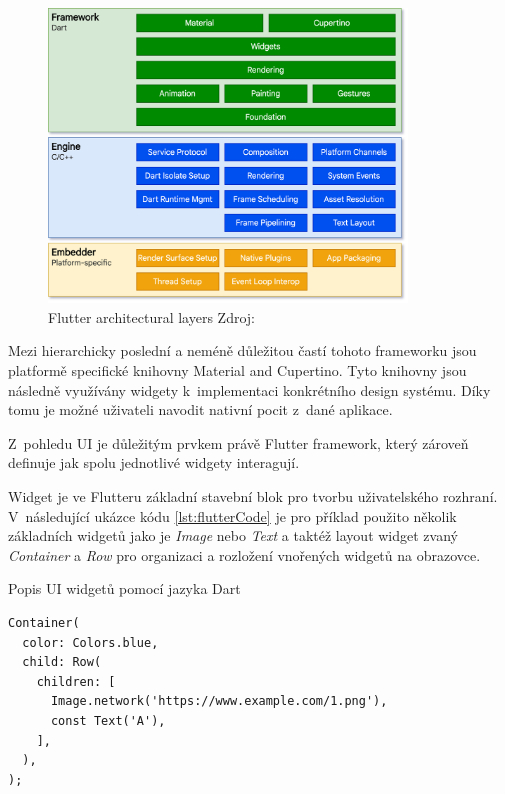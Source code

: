 \begin{figure}[H]
  \centering
  \includegraphics[width=0.85\textwidth]{flutter_architectural_layers.png}
  \caption{Flutter architectural layers Zdroj: \cite{flutterUI}}
  \label{fig:flutter_architectural_layers}
\end{figure}

Mezi hierarchicky poslední a neméně důležitou častí tohoto frameworku jsou platformě specifické knihovny Material and Cupertino. Tyto knihovny
jsou následně využívány widgety k~implementaci konkrétního design systému. Díky tomu je možné uživateli navodit nativní pocit z~dané aplikace.

\medskip

Z~pohledu UI je důležitým prvkem právě Flutter framework, který zároveň definuje jak spolu jednotlivé widgety interagují.

Widget je ve Flutteru základní stavební blok pro tvorbu uživatelského rozhraní. \cite{flutterWidgets} V~následující ukázce kódu \ref{lst:flutterCode} je pro příklad použito několik 
základních widgetů jako je \emph{Image} nebo \emph{Text} a taktéž layout widget zvaný \emph{Container} a \emph{Row} pro organizaci a 
rozložení vnořených widgetů na obrazovce.

\begin{listing}[H]
\caption{Popis UI widgetů pomocí jazyka Dart}\label{lst:flutterCode}
\begin{verbatim}
Container(
  color: Colors.blue,
  child: Row(
    children: [
      Image.network('https://www.example.com/1.png'),
      const Text('A'),
    ],
  ),
);
\end{verbatim}
\end{listing}

